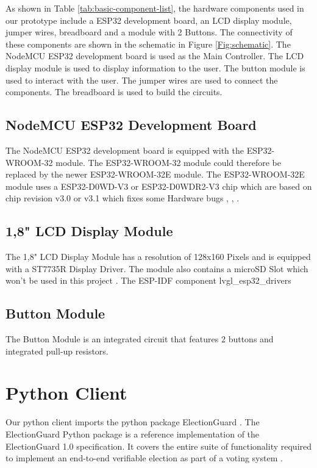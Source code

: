 As shown in Table \ref{tab:basic-component-list}, the hardware components used in our prototype include a ESP32 development board, an LCD display module, jumper wires, breadboard and a module with 2 Buttons. The connectivity of these components are shown in the schematic in Figure \ref{Fig:schematic}. The NodeMCU ESP32 development board is used as the Main Controller. The LCD display module is used to display information to the user. The button module is used to interact with the user. The jumper wires are used to connect the components. The breadboard is used to build the circuits.

\subsection{NodeMCU ESP32 Development Board}
The NodeMCU ESP32 development board is equipped with the ESP32-WROOM-32 module. The ESP32-WROOM-32 module could therefore be replaced by the newer ESP32-WROOM-32E module. The ESP32-WROOM-32E module uses a ESP32-D0WD-V3 or ESP32-D0WDR2-V3 chip which are based on chip revision v3.0 or v3.1 which fixes some Hardware bugs \cite[1]{esp32-module-new}, \cite[11]{esp32-series}, \cite[3-4]{esp32-errata}. 

\subsection{1,8" LCD Display Module}
The 1,8" LCD Display Module has a resolution of 128x160 Pixels and is equipped with a ST7735R Display Driver.  The module also contains a microSD Slot which won't be used in this project \cite[2]{lcd}.
The ESP-IDF component lvgl_esp32_drivers


\subsection{Button Module}
The Button Module is an integrated circuit that features 2 buttons and integrated pull-up resistors. \cite[1]{button-ds}

\section{Python Client}
Our python client imports the python package ElectionGuard \cite{python-reference}. The ElectionGuard Python package is a reference implementation of the ElectionGuard 1.0 specification. It covers the entire suite of functionality required to implement an end-to-end verifiable election as part of a voting system \cite{eg-docs}. 



